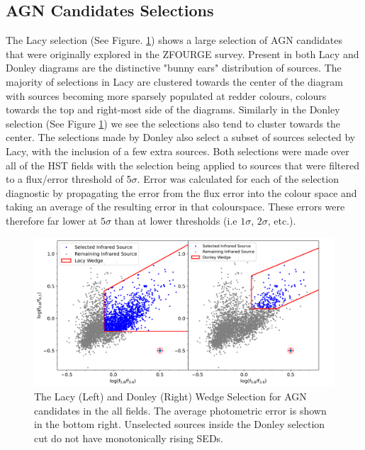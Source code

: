 \documentclass[11pt]{iopart}
\begin{document}
\subsection{AGN Candidates Selections}
The Lacy selection (See Figure. \ref{fig:DonleyLacyWedge}) shows a large selection of AGN candidates that were originally explored in the ZFOURGE survey. Present in both Lacy and Donley diagrams are the distinctive "bunny ears" distribution of sources\cite{sajina_simulating_2005}. The majority of selections in Lacy are clustered towards the center of the diagram with sources becoming more sparsely populated at redder colours, colours towards the top and right-most side of the diagrams. Similarly in the Donley selection (See Figure \ref{fig:DonleyLacyWedge}) we see the selections also tend to cluster towards the center. The selections made by Donley also select a subset of sources selected by Lacy, with the inclusion of a few extra sources. Both selections were made over all of the HST fields with the selection being applied to sources that were filtered to a flux/error threshold of 5$\sigma$. Error was calculated for each of the selection diagnostic by propagating the error from the flux error into the colour space and taking an average of the resulting error in that colourspace. These errors were therefore far lower at $5\sigma$ than at lower thresholds (i.e $1\sigma$, $2\sigma$, etc.). 
\begin{figure}
  \centering
  \includegraphics[width=1\linewidth]{plots/All_fieldsDonleyLacyWedge_error.png}
  \caption{The Lacy (Left) and Donley (Right) Wedge Selection for AGN candidates in the all fields. The average photometric error is shown in the bottom right. Unselected sources inside the Donley selection cut do not have monotonically rising SEDs.}
  \label{fig:DonleyLacyWedge}
\end{figure}
\end{document}
